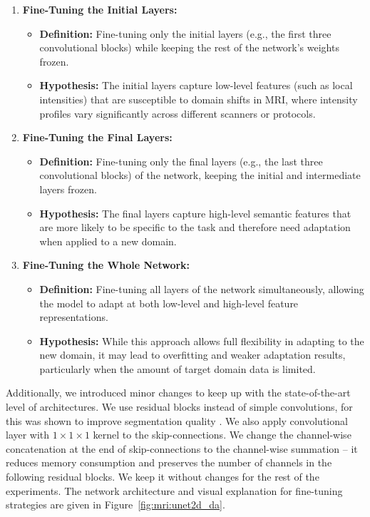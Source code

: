 \begin{enumerate}
	
	\item \textbf{Fine-Tuning the Initial Layers:}
	\begin{itemize}
		\item \textbf{Definition:} Fine-tuning only the initial layers (e.g., the first three convolutional blocks) while keeping the rest of the network's weights frozen.
		\item \textbf{Hypothesis:} The initial layers capture low-level features (such as local intensities) that are susceptible to domain shifts in MRI, where intensity profiles vary significantly across different scanners or protocols.
	\end{itemize}
	
	\item \textbf{Fine-Tuning the Final Layers:}
	\begin{itemize}
		\item \textbf{Definition:} Fine-tuning only the final layers (e.g., the last three convolutional blocks) of the network, keeping the initial and intermediate layers frozen.
		\item \textbf{Hypothesis:} The final layers capture high-level semantic features that are more likely to be specific to the task and therefore need adaptation when applied to a new domain.
	\end{itemize}
	
	\item \textbf{Fine-Tuning the Whole Network:}
	\begin{itemize}
		\item \textbf{Definition:} Fine-tuning all layers of the network simultaneously, allowing the model to adapt at both low-level and high-level feature representations.
		\item \textbf{Hypothesis:} While this approach allows full flexibility in adapting to the new domain, it may lead to overfitting and weaker adaptation results, particularly when the amount of target domain data is limited.
	\end{itemize}
	
\end{enumerate}


Additionally, we introduced minor changes to keep up with the state-of-the-art level of architectures. We use residual blocks \cite{he2016deep} instead of simple convolutions, for this was shown to improve segmentation quality \cite{milletari2016v}. We also apply convolutional layer with $1 \times 1 \times 1$ kernel to the skip-connections. We change the channel-wise concatenation at the end of skip-connections to the channel-wise summation --  it reduces memory consumption and preserves the number of channels in the following residual blocks. We keep it without changes for the rest of the experiments. The network architecture and visual explanation for fine-tuning strategies are given in Figure~\ref{fig:mri:unet2d_da}. %


